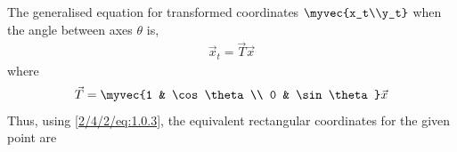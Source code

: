 The generalised equation for transformed coordinates $\myvec{x_t\\y_t}$ when the angle between axes $\theta$ is,
\begin{align}
\vec{x}_t = \vec{T}  \vec{x} \label{2/4/2/eq:1.0.3}  
\end{align}
%
where
\begin{align}
\vec{T} = \myvec{1  &  \cos \theta\\ 0 & \sin \theta} \vec{x}
\end{align}
Thus, using \eqref{2/4/2/eq:1.0.3}, the equivalent rectangular coordinates for the given point are 
